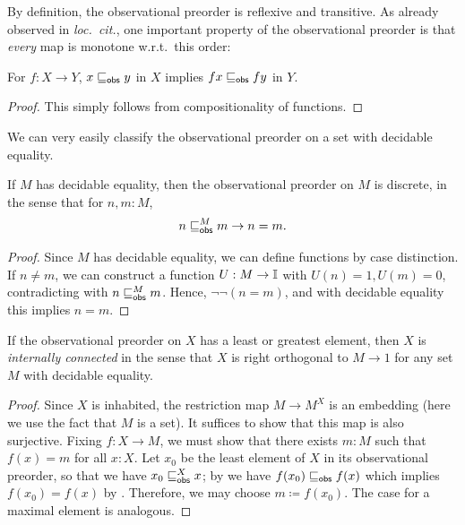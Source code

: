 By definition, the observational preorder is reflexive and transitive. As already observed in \emph{loc.\ cit.}, one important property of the observational preorder is that \emph{every} map is monotone w.r.t.\ this order:

\begin{lemma}\label{lem:anymapmonotoneintriscorder}
  For $f \colon X \to Y$, $x \obsle y$ in $X$ implies $fx \obsle fy$ in $Y$.
\end{lemma}
\begin{proof}
  This simply follows from compositionality of functions.
\end{proof}

We can very easily classify the observational preorder on a set with decidable equality.

\begin{lemma}[\AxiomNT]\label{lem:obs-preord-on-set-with-decidable-equality}
  If $M$ has decidable equality, then the observational preorder on $M$ is discrete, in the sense that for $n,m : M$,
  \[ n \obsle[M] m \to n = m\text{.} \]
\end{lemma}
\begin{proof}
  Since $M$ has decidable equality, we can define functions by case distinction. If $n \neq m$, we can construct a function $U : M \to \mathbb{I}$ with $U(n) = 1,U(m) = 0$, contradicting with $n \obsle[M] m$. Hence, $\neg\neg (n=m)$, and with decidable equality this implies $n = m$.
\end{proof}


\begin{corollary}[\AxiomNT]\label{cor:connectedpreservediscrete}
  If the observational preorder on $X$ has a least or greatest element, then $X$ is \emph{internally connected} in the sense that $X$ is right orthogonal to $M \to 1$ for any set $M$ with decidable equality.
\end{corollary}
\begin{proof}
  Since $X$ is inhabited, the restriction map $M \to M^X$ is an embedding (here we use the fact that $M$ is a set). It suffices to show that this map is also surjective.
  Fixing $f\colon X\to M$, we must show that there exists $m:M$ such that $f(x) = m$ for all $x:X$. Let $x_0$ be the least element of $X$ in its observational preorder, so that we have $x_0\obsle[X] x$; by  we have $f(x_0) \obsle f(x)$ which implies $f(x_0) = f(x)$ by . Therefore, we may choose $m\coloneq f(x_0)$. The case for a maximal element is analogous.
\end{proof}

